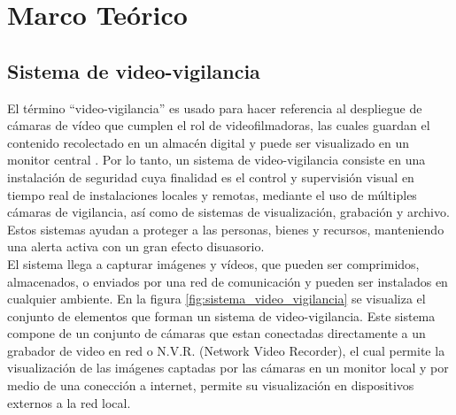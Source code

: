 
\chapter{Marco Teórico}

\section{Sistema de video-vigilancia}
El término ``video-vigilancia'' es usado para hacer referencia al despliegue de cámaras de vídeo que cumplen el rol de videofilmadoras, las cuales guardan el contenido recolectado en un almacén digital y puede ser visualizado en un monitor central \cite{wikipedia:vvigilancia}. Por lo tanto, un sistema de video-vigilancia consiste en una instalación de seguridad cuya finalidad es el control y supervisión visual en tiempo real de instalaciones locales y remotas, mediante el uso de múltiples cámaras de vigilancia, así como de sistemas de visualización, grabación y archivo. Estos sistemas ayudan a proteger a las personas, bienes y recursos, manteniendo una alerta activa con un gran efecto disuasorio.\\

El sistema llega a capturar imágenes y vídeos, que pueden ser comprimidos, almacenados, o enviados por una red de comunicación y pueden ser instalados en cualquier ambiente. En la figura \ref{fig:sistema_video_vigilancia} se visualiza el conjunto de elementos que forman un sistema de video-vigilancia. Este sistema compone de un conjunto de cámaras que estan conectadas directamente a un grabador de video en red o N.V.R. (Network Video Recorder), el cual permite la visualización de las imágenes captadas por las cámaras en un monitor local y por medio de una conección a internet, permite su visualización en dispositivos externos a la red local.\\

